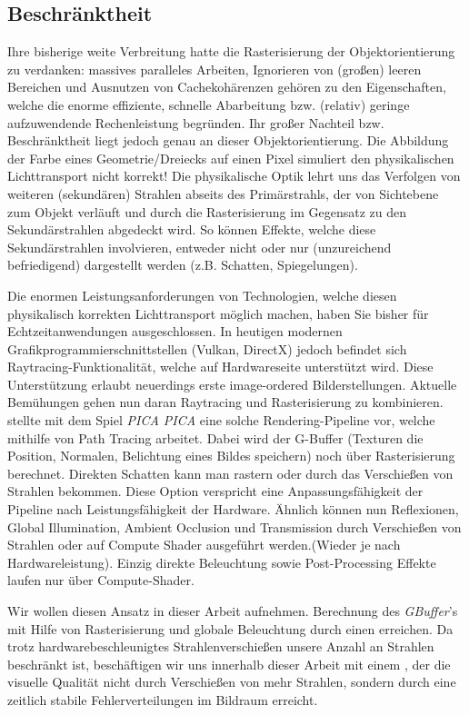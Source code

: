         \subsection{Beschränktheit}
        \label{sec:Rasterisierung:Beschränktheit}

        Ihre bisherige weite Verbreitung hatte die Rasterisierung der Objektorientierung zu verdanken: massives paralleles Arbeiten, Ignorieren von (großen) leeren Bereichen und
        Ausnutzen von Cachekohärenzen gehören zu den Eigenschaften, welche die enorme effiziente, schnelle Abarbeitung bzw. (relativ) geringe aufzuwendende Rechenleistung begründen.
        Ihr großer Nachteil bzw. Beschränktheit liegt jedoch genau an dieser Objektorientierung. 
        Die Abbildung der Farbe eines Geometrie/Dreiecks auf einen Pixel simuliert
        den physikalischen Lichttransport nicht korrekt! Die physikalische Optik lehrt uns das Verfolgen von weiteren (sekundären) Strahlen abseits des Primärstrahls, der von 
        Sichtebene zum Objekt verläuft und durch die Rasterisierung im Gegensatz zu den Sekundärstrahlen abgedeckt wird. So können Effekte, welche diese Sekundärstrahlen involvieren, 
        entweder nicht oder nur (unzureichend befriedigend) dargestellt werden (z.B. Schatten, Spiegelungen). \par

        Die enormen Leistungsanforderungen von Technologien, welche diesen physikalisch korrekten Lichttransport möglich machen, haben Sie bisher für Echtzeitanwendungen ausgeschlossen.
        In heutigen modernen Grafikprogrammierschnittstellen (Vulkan, DirectX) jedoch befindet sich Raytracing-Funktionalität, welche auf Hardwareseite unterstützt wird.
        Diese Unterstützung erlaubt neuerdings erste image-ordered Bilderstellungen.  
        Aktuelle Bemühungen gehen nun daran Raytracing und Rasterisierung zu kombinieren. \cite{Barre-Brisebois2019} stellte
        mit dem Spiel \textit{PICA PICA} eine solche Rendering-Pipeline vor, welche mithilfe von Path Tracing arbeitet. Dabei wird der G-Buffer
        (Texturen die Position, Normalen, Belichtung eines Bildes speichern) noch über Rasterisierung berechnet. Direkten Schatten kann man 
        rastern oder durch das Verschießen von Strahlen bekommen. Diese Option verspricht eine Anpassungsfähigkeit der Pipeline nach Leistungsfähigkeit der Hardware. Ähnlich können nun
        Reflexionen, Global Illumination, Ambient Occlusion und Transmission durch Verschießen von Strahlen oder auf Compute Shader ausgeführt werden.(Wieder je nach 
        Hardwareleistung). Einzig direkte Beleuchtung sowie Post-Processing Effekte laufen nur über Compute-Shader. \par

        Wir wollen diesen Ansatz in dieser Arbeit aufnehmen. Berechnung des \textit{GBuffer}'s mit Hilfe von Rasterisierung und globale Beleuchtung durch 
        einen  erreichen. Da trotz hardwarebeschleunigtes Strahlenverschießen unsere Anzahl an Strahlen beschränkt ist, 
        beschäftigen wir uns innerhalb dieser Arbeit mit einem , der die visuelle Qualität nicht durch Verschießen von mehr Strahlen, 
        sondern durch eine zeitlich stabile  Fehlerverteilungen im Bildraum erreicht.
